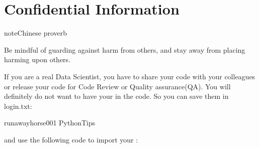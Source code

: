 \documentclass[letterpaper,12pt,english]{sphinxmanual}
\begin{document}
\begin{figure}[htbp]
\centering

\noindent{}
\end{figure}


\chapter{Confidential Information}
\label{\detokenize{confi:confidential-information}}\label{\detokenize{confi:confi}}\label{\detokenize{confi::doc}}
\begin{sphinxadmonition}{note}{Chinese proverb}

Be mindful of guarding against harm from others, and stay away from placing harming upon others.
\end{sphinxadmonition}

If you are a real Data Scientist, you have to share your code with your colleagues or release your code for Code Review or Quality assurance(QA). You will definitely do not want to have your  in the code. So you can save them in login.txt:

\begin{sphinxVerbatim}[commandchars=\\\{\}]
runawayhorse001
PythonTips
\end{sphinxVerbatim}

and use the following code to import your :

\begin{sphinxVerbatim}[commandchars=\\\{\}]
       
      \PYG{p}{[}\PYG{p}{]}\PYG{p}{[}\PYG{p}{]}
      \PYG{p}{[}\PYG{p}{]}\PYG{p}{[}\PYG{p}{]}
\end{sphinxVerbatim}
\end{document}
